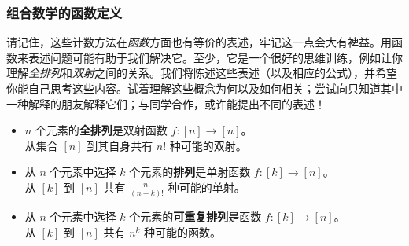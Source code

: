 \subsubsection*{组合数学的函数定义}

请记住，这些计数方法在\emph{函数}方面也有等价的表述，牢记这一点会大有裨益。用函数来表述问题可能有助于我们解决它。至少，它是一个很好的思维训练，例如让你理解\emph{全排列}和\emph{双射}之间的关系。我们将陈述这些表述（以及相应的公式），并希望你能自己思考这些内容。试着理解这些概念为何以及如何相关；尝试向只知道其中一种解释的朋友解释它们；与同学合作，或许能提出不同的表述！

\begin{itemize}
    \item $n$ 个元素的\textbf{全排列}是双射函数 $f : [n] \to [n]$。\\
          从集合 $[n]$ 到其自身共有 $n!$ 种可能的双射。
    \item 从 $n$ 个元素中选择 $k$ 个元素的\textbf{排列}是单射函数 $f : [k] \to [n]$。\\
          从 $[k]$ 到 $[n]$ 共有 $\frac{n!}{(n-k)!}$ 种可能的单射。
    \item 从 $n$ 个元素中选择 $k$ 个元素的\textbf{可重复排列}是函数 $f : [k] \to [n]$。 \\
          从 $[k]$ 到 $[n]$ 共有 $n^k$ 种可能的函数。
\end{itemize}